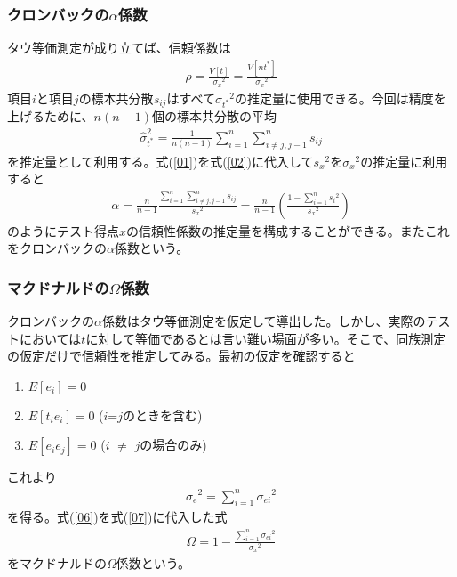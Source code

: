 \documentclass{jarticle}
\begin{document}
\subsubsection{クロンバックの$\displaystyle \alpha$係数}
タウ等価測定が成り立てば、信頼係数は
\begin{eqnarray}
  \label{02}
  \displaystyle \rho=\frac{V[t]}{{\sigma_{x}}^2}=\frac{V[nt^{\ast}]}{{\sigma_{x}}^2}
\end{eqnarray}
項目$i$と項目$j$の標本共分散$s_{ij}$はすべて$\displaystyle  {\sigma_{t^\ast}}^2$の推定量に使用できる。今回は精度を上げるために、$n(n-1)$個の標本共分散の平均
\begin{eqnarray}
  \label{01}
  \displaystyle \hat{\sigma}_{t^\ast}^2=\frac{1}{n(n-1)}\sum_{i=1}^{n} \sum_{i\neq j,j-1}^{n} s_{ij}
\end{eqnarray}
を推定量として利用する。式(\ref{01})を式(\ref{02})に代入して${s_{x}}^2$を${\sigma_{x}}^2$の推定量に利用すると
\begin{eqnarray}
  \displaystyle \alpha=\frac{n}{n-1} \frac{\sum_{i=1}^{n} \sum_{i\neq j,j-1}^{n} s_{ij}}{{s_{x}}^2}=\frac{n}{n-1} \left(\frac{1-\sum_{i=1}^{n} {s_{i}}^2} {{s_{x}}^2}\right)
\end{eqnarray}
のようにテスト得点$x$の信頼性係数の推定量を構成することができる。またこれをクロンバックの$\alpha$係数という。
\subsubsection{マクドナルドの$\displaystyle \Omega$係数}
クロンバックの$\alpha$係数はタウ等価測定を仮定して導出した。しかし、実際のテストにおいては$t$に対して等価であるとは言い難い場面が多い。そこで、同族測定の仮定だけで信頼性を推定してみる。最初の仮定を確認すると
\begin{screen}
  \begin{enumerate}
    \item  $E[e_{i}] = 0$
    \item  $E[t_{i}e_{i}] = 0$ ($i$=$j$のときを含む)
    \item  $E[e_{i}e_{j}] = 0$ ($i$ $\neq$ $j$の場合のみ)
  \end{enumerate}
\end{screen}
これより
\begin{eqnarray}
  \label{06}
  \displaystyle {\sigma_{e}}^2=\sum_{i=1}^{n} {\sigma_{ei}}^2
\end{eqnarray}
を得る。式(\ref{06})を式(\ref{07})に代入した式
\begin{eqnarray}
  \label{08}
\displaystyle \Omega=1-\frac{\sum_{i=1}^{n} {\sigma_{ei}}^2}{{\sigma_{x}}^2}
\end{eqnarray}
をマクドナルドの$\Omega$係数という。
\end{document}
